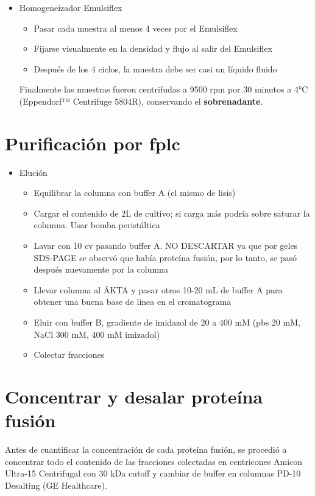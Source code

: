 \begin{appendix}
\begin{itemize}
\item{Homogeneizador Emulsiflex}
     \begin{itemize}
        \item{Pasar cada muestra al menos 4 veces por el Emulsiflex}
        \item{Fijarse visualmente en la densidad y flujo al salir del Emulsiflex}
        \item{Después de los 4 ciclos, la muestra debe ser casi un líquido fluido}
    \end{itemize}

Finalmente las muestras fueron centrifudas a 9500 \ac{rpm} por 30 minutos a 4°C (Eppendorf™ Centrifuge 5804R), conservando el \textbf{sobrenadante}. 
\end{itemize}

\section{Purificación por \ac{fplc}}

\begin{itemize}
    \item{Elución}
     \begin{itemize}
        \item{Equilibrar la columna con buffer A (el mismo de lisis)}
        \item{Cargar el contenido de 2L de cultivo; si carga más podría sobre saturar la columna. Usar bomba peristáltica}
        \item{Lavar con 10 \ac{cv} pasando buffer A. NO DESCARTAR ya que por geles \ac{SDS-PAGE} se observó que había proteína fusión, por lo tanto, se pasó después nuevamente por la columna}
        \item{Llevar columna al \"{A}KTA y pasar otros 10-20 mL de buffer A para obtener una buena base de linea en el cromatograma}
        \item{Eluir con buffer B, gradiente de imidazol de 20 a 400 mM (\ac{pbs} 20 mM, NaCl 300 mM, 400 mM imizadol)}
        \item{Colectar fracciones}
    \end{itemize}
\end{itemize}

\section{Concentrar y desalar proteína fusión}
Antes de cuantificar la concentración de cada proteína fusión, se procedió a concentrar todo el contenido de las fracciones colectadas en centricones Amicon Ultra-15 Centrifugal con 30 kDa  cutoff y cambiar de buffer en columnas PD-10 Desalting (GE Healthcare).


\end{appendix}
